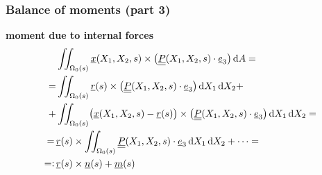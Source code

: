\begin{frame}
  \frametitle{Balance of moments (part 3)}
  \textbf{moment due to internal forces} %
  \begin{displaymath}
    \begin{alignedat}{1}
      &\iint_{\Omega_0(s)} \underline{x}(X_1,X_2,s) \times \bigl( \doubleunderline{P}(X_1,X_2,s) \cdot \underline{e}_3 \bigr) \dif A = \\
      =&\iint_{\Omega_0(s)} \underline{r}(s) \times \bigl( \doubleunderline{P}(X_1,X_2,s) \cdot \underline{e}_3 \bigr) \dif X_1 \dif X_2 + \\
      + &\iint_{\Omega_0(s)} \bigl( \underline{x}(X_1,X_2,s) - \underline{r}(s) \bigr) \times \bigl( \doubleunderline{P}(X_1,X_2,s) \cdot \underline{e}_3 \bigr) \dif X_1 \dif X_2 = \\
      = \, &\underline{r}(s) \times \iint_{\Omega_0(s)} \doubleunderline{P}(X_1,X_2,s) \cdot \underline{e}_3 \dif X_1 \dif X_2 + \dots = \\
      =: \, &\underline{r}(s) \times \underline{n}(s) + \underline{m}(s)
    \end{alignedat}
  \end{displaymath}
\end{frame}


